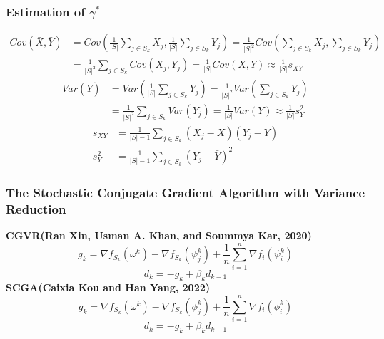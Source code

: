 \documentclass{beamer}
\begin{document}
\begin{frame}
	\frametitle{\bf Estimation of $\gamma^*$} 
\begin{equation}
	\begin{aligned}
		Cov(\bar{X},\bar{Y})  &=Cov(\frac{1}{|S|}\sum_{j\in S_k} X_j,\frac{1}{|S|}\sum_{j\in S_k} Y_j)=\frac{1}{|S|^2}Cov(\sum_{j\in S_k} X_j,\sum_{j\in S_k} Y_j)\\
		&=\frac{1}{|S|^2}\sum_{j\in S_k} Cov(X_j,Y_j)=\frac{1}{|S|} Cov(X,Y)\approx \frac{1}{|S|}s_{XY}
		\label{2:cov_estimate}
	\end{aligned}
\end{equation}
\begin{equation}
	\begin{aligned}
		Var(\bar{Y})  &=Var(\frac{1}{|S|}\sum_{j\in S_k} Y_j)=\frac{1}{|S|^2}Var(\sum_{j\in S_k} Y_j)\\&=\frac{1}{|S|^2}\sum_{j\in S_k} Var(Y_j)		=\frac{1}{|S|} Var(Y)\approx \frac{1}{|S|}s_{Y}^2
		\label{2:var_estimate}
	\end{aligned}
\end{equation}
\begin{equation}
	\begin{aligned}
		s_{XY}&=\frac{1}{|S|-1}\sum_{j\in S_k}(X_j-\bar{X})(Y_j-\bar{Y})\\
		s_{Y}^2&=\frac{1}{|S|-1}\sum_{j\in S_k}(Y_j-\bar{Y})^2
		\label{2:sample_variance}
	\end{aligned}
\end{equation}
\end{frame}
\begin{frame}
	\frametitle{\bf The Stochastic Conjugate Gradient Algorithm with Variance Reduction} 
			\textbf { CGVR(Ran Xin, Usman A. Khan, and Soummya Kar, 2020)}
$$g_k = \nabla f_{S_k}(\omega^k)-\nabla f_{S_k}(\psi_j^k)+ \frac{1}{n} \sum_{i=1}^{n}\nabla f_i(\psi_i^k)$$
$$d_k = -g_k +\beta_k d_{k-1}$$
			\textbf { SCGA(Caixia Kou and Han Yang, 2022)}
	$$g_k = \nabla f_{S_k}(\omega^k)-\nabla f_{S_k}(\phi_j^k)+ \frac{1}{n} \sum_{i=1}^{n}\nabla f_i(\phi_i^k)$$
    $$d_k = -g_k +\beta_k d_{k-1}$$
\end{frame}
\end{document}
